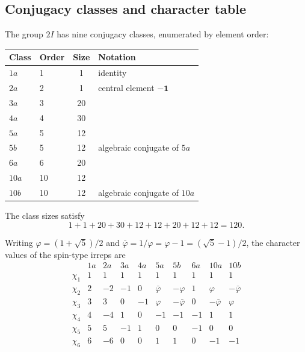 \documentclass[11pt,a4paper]{article}
\begin{document}
  \subsection{Conjugacy classes and character table}
    \label{sec:step5-chars}

    The group $2I$ has nine conjugacy classes, enumerated by element order:
    \begin{center}
      \begin{tabular}{llcl}
        \hline
        Class & Order & Size & Notation                      \\
        \hline
        $1a$  & 1     & 1    & identity                      \\
        $2a$  & 2     & 1    & central element $-\mathbf{1}$ \\
        $3a$  & 3     & 20   &                               \\
        $4a$  & 4     & 30   &                               \\
        $5a$  & 5     & 12   &                               \\
        $5b$  & 5     & 12   & algebraic conjugate of $5a$   \\
        $6a$  & 6     & 20   &                               \\
        $10a$ & 10    & 12   &                               \\
        $10b$ & 10    & 12   & algebraic conjugate of $10a$  \\
        \hline
      \end{tabular}
    \end{center}
    The class sizes satisfy
    \[
      1+1+20+30+12+12+20+12+12 = 120.
    \]

    Writing $\varphi = (1+\sqrt{5})/2$ and
    $\bar\varphi = 1/\varphi = \varphi - 1 = (\sqrt{5}-1)/2$, the character
    values of the spin-type irreps are
    \begin{equation}
      \renewcommand{\arraystretch}{1.3}
      \begin{array}{l|rrrrrrrrr}
        & 1a & 2a & 3a & 4a & 5a & 5b & 6a & 10a & 10b \\
        \hline
        \chi_1 & 1 &  1 &  1 &  1 &  1 &  1 &  1 &  1 &  1 \\
        \chi_2 & 2 & -2 & -1 &  0 & \bar\varphi & -\varphi & 1 & \varphi & -\bar\varphi \\
        \chi_3 & 3 &  3 &  0 & -1 & \varphi & -\bar\varphi & 0 & -\bar\varphi & \varphi \\
        \chi_4 & 4 & -4 &  1 &  0 & -1 & -1 & -1 & 1 & 1 \\
        \chi_5 & 5 &  5 & -1 &  1 &  0 &  0 & -1 & 0 & 0 \\
        \chi_6 & 6 & -6 &  0 &  0 &  1 &  1 &  0 & -1 & -1
      \end{array}
      \label{eq:CT-2I}
    \end{equation}
\end{document}
